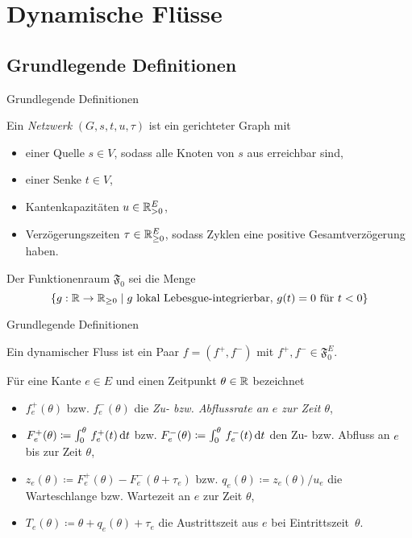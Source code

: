 \section{Dynamische Flüsse}
\subsection{Grundlegende Definitionen}

\begin{frame}{Grundlegende Definitionen}
	\begin{definition}[Netzwerk]
		Ein \emph{Netzwerk} $(G, s, t, u, \tau)$ ist ein gerichteter Graph mit
		\begin{itemize}[label=\color{darkblue}$\bullet$]
			\item einer Quelle $s\in V$, sodass alle Knoten von $s$ aus erreichbar sind,
			\item einer Senke $t\in V$,
			\item Kantenkapazitäten $u\in\mathbb{R}_{>0}^E$,
			\item Verzögerungszeiten $\tau\in\mathbb{R}_{\geq 0}^E$, sodass Zyklen eine positive Gesamtverzögerung haben.
		\end{itemize}
	\end{definition}
	\pause
	\begin{definition}
		Der Funktionenraum $\mathfrak{F}_0$ sei die Menge
		\[ \{ g: \mathbb{R}\to\mathbb{R}_{\geq 0} \mid \text{$g$ lokal Lebesgue-integrierbar, $g(t) = 0$ für $t<0$} \} \]
	\end{definition}
\end{frame}


\begin{frame}{Grundlegende Definitionen}
	\begin{definition}
		Ein dynamischer Fluss ist ein Paar $f=(f^+, f^-)$ mit $f^+, f^-\in\mathfrak{F}_0^E$.
		
		Für eine Kante $e\in E$ und einen Zeitpunkt $\theta\in\mathbb{R}$ bezeichnet
		\begin{itemize}[label=$\color{darkblue}\bullet$]
			\pause\item $f_e^+(\theta)$ bzw. $f_e^-(\theta)$ die \emph{Zu- bzw. Abflussrate an $e$ zur Zeit $\theta$},
			\pause\item $F_e^+(\theta) \coloneq \int_0^\theta\,f^+_e(t) \mathop{}\!\mathrm{d} t$ bzw. $F^-_e(\theta)\coloneq\int_0^\theta\, f^-_e(t)\mathop{}\!\mathrm{d} t$ den Zu- bzw. Abfluss an $e$ bis zur Zeit $\theta$,
			\pause\item $z_e(\theta)\coloneq F_e^+(\theta) - F_e^-(\theta + \tau_e)$ bzw. $q_e(\theta)\coloneq z_e(\theta)/u_e$ die Warteschlange bzw. Wartezeit an $e$ zur Zeit $\theta$,
			\pause\item $T_e(\theta)\coloneq\theta + q_e(\theta) + \tau_e$ die Austrittszeit aus $e$ bei Eintrittszeit~$\theta$.
		\end{itemize}	
	\end{definition}
\end{frame}


